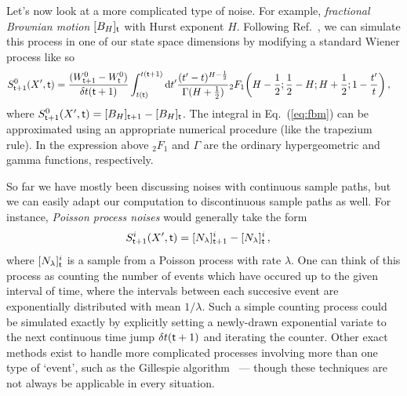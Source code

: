 \documentclass{book}
\begin{document}
Let's now look at a more complicated type of noise. For example, \emph{fractional Brownian motion} $[B_{H}]_{\sf t}$ with Hurst exponent $H$. Following Ref.~\cite{decreusefond1999stochastic}, we can simulate this process in one of our state space dimensions by modifying a standard Wiener process like so
\begin{align}
S^{0}_{{\sf t}+1}(X',{\sf t}) &= \frac{(W^0_{{\sf t}+1} - W^0_{\sf t})}{\delta t({\sf t}+1)}\int^{t({\sf t}+1)}_{t({\sf t})}{\rm d}t' \frac{(t'-t)^{H-\frac{1}{2}}}{\Gamma (H+\frac{1}{2})} {}_2F_1 \bigg( H-\frac{1}{2};\frac{1}{2}-H;H+\frac{1}{2};1-\frac{t'}{t}\bigg) \label{eq:fbm} \,,
\end{align}
where $S^{0}_{{\sf t}+1}(X',{\sf t})=[B_{H}]_{{\sf t}+1}-[B_{H}]_{{\sf t}}$. The integral in Eq.~(\ref{eq:fbm}) can be approximated using an appropriate numerical procedure (like the trapezium rule). In the expression above ${}_2F_1$ and $\Gamma$ are the ordinary hypergeometric and gamma functions, respectively.

So far we have mostly been discussing noises with continuous sample paths, but we can easily adapt our computation to discontinuous sample paths as well. For instance, \emph{Poisson process noises} would generally take the form
\begin{align}
S^{i}_{{\sf t}+1}(X',{\sf t}) &= [N_{\lambda}]^i_{{\sf t}+1}-[N_{\lambda}]^i_{\sf t}\,,
\end{align}
where $[N_{\lambda}]^i_{\sf t}$ is a sample from a Poisson process with rate $\lambda$. One can think of this process as counting the number of events which have occured up to the given interval of time, where the intervals between each succesive event are exponentially distributed with mean $1/\lambda$. Such a simple counting process could be simulated exactly by explicitly setting a newly-drawn exponential variate to the next continuous time jump ${\delta t}({\sf t}+1)$ and iterating the counter. Other exact methods exist to handle more complicated processes involving more than one type of `event', such as the Gillespie algorithm~\cite{gillespie1977exact} --- though these techniques are not always be applicable in every situation.
\end{document}
